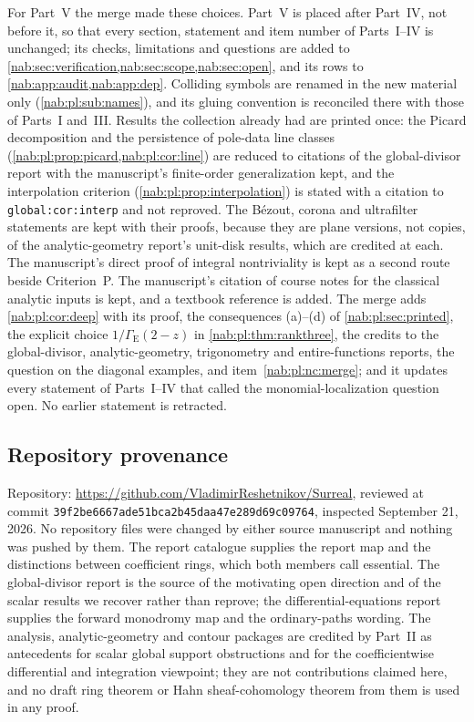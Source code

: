 \documentclass[11pt,letterpaper]{article}
\theoremstyle{definition}
\theoremstyle{remark}
\numberwithin{equation}{section}
\begin{document}
For Part~V the merge made these choices. Part~V is placed after Part~IV, not
before it, so that every section, statement and item number of Parts~I--IV is
unchanged; its checks, limitations and questions are added to
\cref{nab:sec:verification,nab:sec:scope,nab:sec:open}, and its rows to
\cref{nab:app:audit,nab:app:dep}. Colliding symbols are renamed in the new
material only (\cref{nab:pl:sub:names}), and its gluing convention is
reconciled there with those of Parts~I and~III. Results the collection already
had are printed once: the Picard decomposition and the persistence of pole-data
line classes (\cref{nab:pl:prop:picard,nab:pl:cor:line}) are reduced to
citations of the global-divisor report with the manuscript's finite-order
generalization kept, and the interpolation criterion
(\cref{nab:pl:prop:interpolation}) is stated with a citation to
\nolinkurl{global:cor:interp} and not reproved. The B\'ezout, corona and
ultrafilter statements are kept with their proofs, because they are plane
versions, not copies, of the analytic-geometry report's unit-disk results, which
are credited at each. The manuscript's direct proof of integral nontriviality
is kept as a second route beside Criterion~P. The manuscript's citation of
course notes for the classical analytic inputs is kept, and a textbook
reference is added. The merge adds \cref{nab:pl:cor:deep} with its proof, the
consequences (a)--(d) of \cref{nab:pl:sec:printed}, the explicit choice
$1/\Gamma_{\mathrm E}(2-z)$ in \cref{nab:pl:thm:rankthree}, the credits to the
global-divisor, analytic-geometry, trigonometry and entire-functions reports,
the question on the diagonal examples, and item~\ref{nab:pl:nc:merge}; and it
updates every statement of Parts~I--IV that called the monomial-localization
question open. No earlier statement is retracted.

\subsection{Repository provenance}

Repository: \url{https://github.com/VladimirReshetnikov/Surreal}, reviewed at
commit \texttt{39f2be6667ade51bca2b45daa47e289d69c09764}, inspected
September 21, 2026. No repository files were changed by either source
manuscript and nothing was pushed by them. The report catalogue
\cite{RepoMap} supplies the report map and the distinctions between coefficient
rings, which both members call essential. The global-divisor report
\cite{RepoGlobal} is the source of the motivating open direction and of the
scalar results we recover rather than reprove; the differential-equations
report \cite{RepoDiff} supplies the forward monodromy map and the
ordinary-paths wording. The analysis, analytic-geometry and contour packages
\cite{RepoAnalysis,RepoGeometry,RepoContours} are credited by Part~II as
antecedents for scalar global support obstructions and for the coefficientwise
differential and integration viewpoint; they are not contributions claimed
here, and no draft ring theorem or Hahn sheaf-cohomology theorem from them is
used in any proof.
\end{document}
